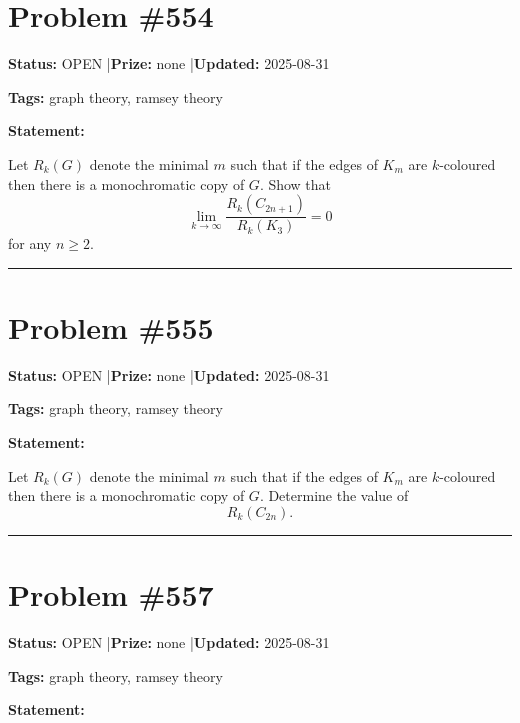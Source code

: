 \documentclass{article}
\begin{document}
\section{Problem \#554}
\label{prob:554}

\noindent\textbf{Status:} OPEN \quad|\quad \textbf{Prize:} none \quad|\quad \textbf{Updated:} 2025-08-31

\noindent\textbf{Tags:} graph theory, ramsey theory

\medskip

\noindent\textbf{Statement:}

Let $R_k(G)$ denote the minimal $m$ such that if the edges of $K_m$ are $k$-coloured then there is a monochromatic copy of $G$. Show that\[\lim_{k\to \infty}\frac{R_k(C_{2n+1})}{R_k(K_3)}=0\]for any $n\geq 2$.

\noindent\rule{\linewidth}{0.4pt}


\section{Problem \#555}
\label{prob:555}

\noindent\textbf{Status:} OPEN \quad|\quad \textbf{Prize:} none \quad|\quad \textbf{Updated:} 2025-08-31

\noindent\textbf{Tags:} graph theory, ramsey theory

\medskip

\noindent\textbf{Statement:}

Let $R_k(G)$ denote the minimal $m$ such that if the edges of $K_m$ are $k$-coloured then there is a monochromatic copy of $G$. Determine the value of\[R_k(C_{2n}).\]

\noindent\rule{\linewidth}{0.4pt}


\section{Problem \#557}
\label{prob:557}

\noindent\textbf{Status:} OPEN \quad|\quad \textbf{Prize:} none \quad|\quad \textbf{Updated:} 2025-08-31

\noindent\textbf{Tags:} graph theory, ramsey theory

\medskip

\noindent\textbf{Statement:}
\end{document}
